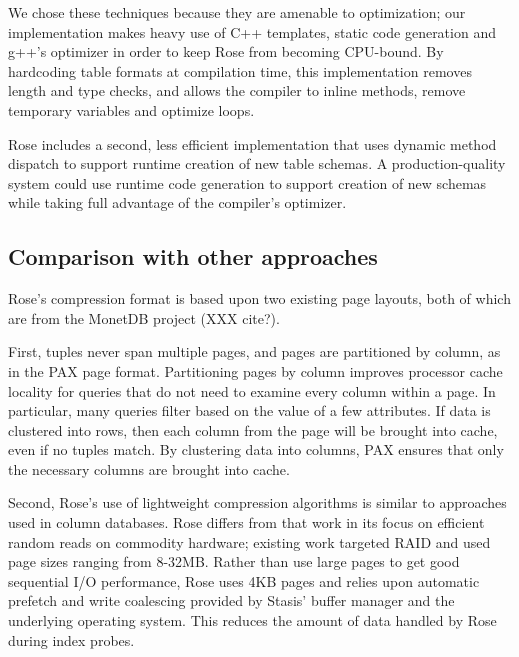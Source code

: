 \documentclass{vldb}
\newcommand{\rows}{Rose\xspace}
\newcommand{\rowss}{Rose's\xspace}
\begin{document}
We chose these techniques because they are amenable to optimization;
our implementation makes heavy use of C++ templates, static code
generation and g++'s optimizer in order to keep \rows from becoming
CPU-bound.  By hardcoding table formats at compilation time, this
implementation removes length and type checks, and allows the compiler
to inline methods, remove temporary variables and optimize loops.

\rows includes a second, less efficient implementation that uses
dynamic method dispatch to support runtime creation of new table
schemas.  A production-quality system could use runtime code
generation to support creation of new schemas while taking full
advantage of the compiler's optimizer.

\subsection{Comparison with other approaches}

\rowss compression format is based upon two existing page layouts, both of which are from the MonetDB project (XXX cite?).

First, tuples never span multiple pages, and pages are partitioned by
column, as in the PAX page format.  Partitioning pages by column
improves processor cache locality for queries that do not need to
examine every column within a page.  In particular, many queries
filter based on the value of a few attributes.  If data is clustered
into rows, then each column from the page will be brought into cache,
even if no tuples match.  By clustering data into columns, PAX ensures
that only the necessary columns are brought into cache\cite{PAX}.

Second, \rowss use of lightweight compression algorithms is similar to
approaches used in column databases\cite{XXX}.  \rows differs from
that work in its focus on efficient random reads on commodity
hardware; existing work targeted RAID and used page sizes ranging from 8-32MB.  Rather
than use large pages to get good sequential I/O performance, \rows
uses 4KB pages and relies upon automatic prefetch and write coalescing
provided by Stasis' buffer manager and the underlying operating
system.  This reduces the amount of data handled by \rows during index
probes.
\end{document}
